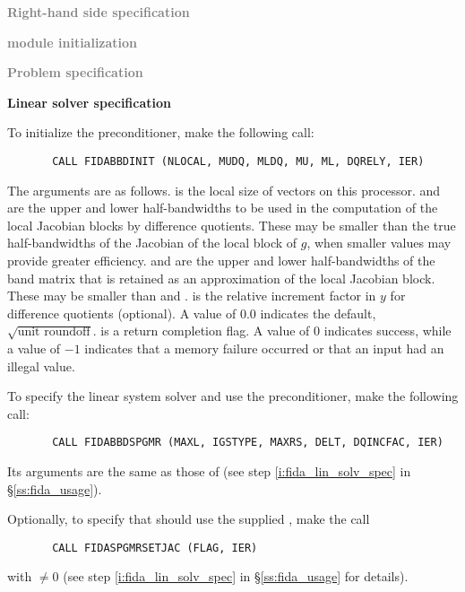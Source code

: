\begin{Steps}
  
\item \textcolor{gray}{\bf Right-hand side specification}

\item \textcolor{gray}{\bf {\nvector} module initialization}

\item \textcolor{gray}{\bf Problem specification}

\item {\bf Linear solver specification}

  To initialize the {\idabbdpre} preconditioner, make the following call:
\begin{verbatim}
       CALL FIDABBDINIT (NLOCAL, MUDQ, MLDQ, MU, ML, DQRELY, IER)
\end{verbatim}
  The arguments are as follows.
   is the local size of vectors on this processor.
   and  are the upper and lower half-bandwidths to be used in 
  the computation of the local Jacobian blocks by difference quotients.
  These may be smaller than the true half-bandwidths of the
  Jacobian of the local block of $g$, when smaller values may
  provide greater efficiency.
   and  are the upper and lower half-bandwidths of the band matrix
  that  is retained as an approximation of the local Jacobian block.
  These may be smaller than  and .
   is the relative increment factor in $y$ for difference quotients
  (optional).  A value of $0.0$ indicates the default, $\sqrt{\text{unit roundoff}}$.
   is a return completion flag.  A value of $0$ indicates success, while
  a value of $-1$ indicates that a memory failure occurred or that an input had
  an illegal value.

  To specify the {\spgmr} linear system solver and use the {\idabbdpre}
  preconditioner, make the following call:
\begin{verbatim}
       CALL FIDABBDSPGMR (MAXL, IGSTYPE, MAXRS, DELT, DQINCFAC, IER)
\end{verbatim}
  Its arguments are the same as those of 
  (see step \ref{i:fida_lin_solv_spec} in \S\ref{ss:fida_usage}).


  Optionally, to specify that {\spgmr} should use the supplied , 
  make the call
\begin{verbatim}
       CALL FIDASPGMRSETJAC (FLAG, IER)
\end{verbatim}
  with  $\neq 0$ 
  (see step \ref{i:fida_lin_solv_spec} in \S\ref{ss:fida_usage} for details).


\end{Steps}
